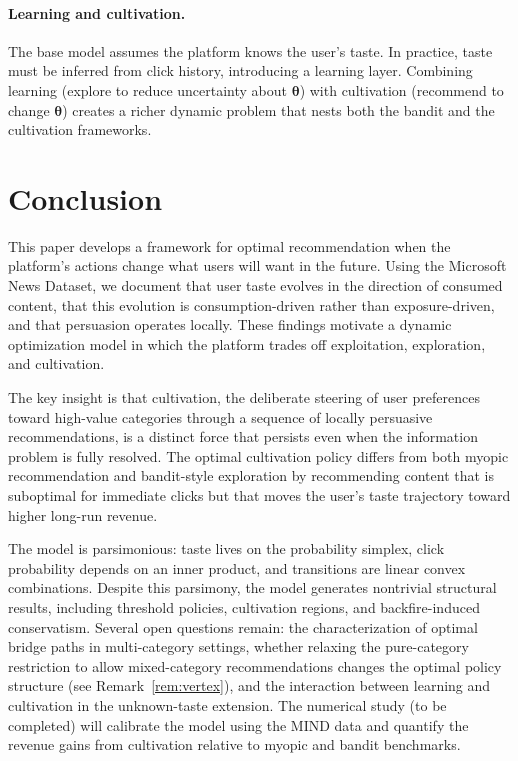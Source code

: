 \documentclass[11pt]{article}
\begin{document}
\paragraph{Learning and cultivation.} The base model assumes the platform knows the user's taste. In practice, taste must be inferred from click history, introducing a learning layer. Combining learning (explore to reduce uncertainty about $\boldsymbol{\theta}$) with cultivation (recommend to change $\boldsymbol{\theta}$) creates a richer dynamic problem that nests both the bandit and the cultivation frameworks.

\section{Conclusion}
\label{sec:conclusion}

This paper develops a framework for optimal recommendation when the platform's actions change what users will want in the future. Using the Microsoft News Dataset, we document that user taste evolves in the direction of consumed content, that this evolution is consumption-driven rather than exposure-driven, and that persuasion operates locally. These findings motivate a dynamic optimization model in which the platform trades off exploitation, exploration, and cultivation.

The key insight is that cultivation, the deliberate steering of user preferences toward high-value categories through a sequence of locally persuasive recommendations, is a distinct force that persists even when the information problem is fully resolved. The optimal cultivation policy differs from both myopic recommendation and bandit-style exploration by recommending content that is suboptimal for immediate clicks but that moves the user's taste trajectory toward higher long-run revenue.

The model is parsimonious: taste lives on the probability simplex, click probability depends on an inner product, and transitions are linear convex combinations. Despite this parsimony, the model generates nontrivial structural results, including threshold policies, cultivation regions, and backfire-induced conservatism. Several open questions remain: the characterization of optimal bridge paths in multi-category settings, whether relaxing the pure-category restriction to allow mixed-category recommendations changes the optimal policy structure (see Remark~\ref{rem:vertex}), and the interaction between learning and cultivation in the unknown-taste extension. The numerical study (to be completed) will calibrate the model using the MIND data and quantify the revenue gains from cultivation relative to myopic and bandit benchmarks.
\end{document}
